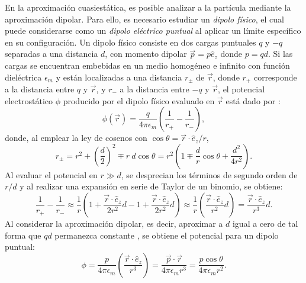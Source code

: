 En la aproximación cuasiestática, es posible analizar a la partícula mediante la aproximación dipolar. Para ello, es necesario estudiar un \textit{dipolo físico}, el cual puede considerarse como un \textit{dipolo eléctrico puntual} al aplicar un límite específico en su configuración. Un dipolo físico consiste en dos cargas puntuales $q$ y $-q$ separadas a una distancia $d$, con momento dipolar $\Vec{p}=p\hat{e}_z$ donde $p=qd$. Si las cargas se encuentran embebidas en un medio homogéneo e infinito con función dieléctrica $\epsilon_m$ y están localizadas a una distancia $r_{\pm}$ de $\Vec{r}$, donde $r_{+}$ corresponde a la distancia entre $q$ y $\Vec{r}$, y $r_{-}$ a la distancia entre $-q$ y $\Vec{r}$, el potencial  electrostático $\phi$ producido por el dipolo físico evaluado en $\Vec{r}$ está dado por \cite{Bohren,Griffiths}:
\begin{equation}
    \phi(\Vec{r})=\frac{q}{4\pi\epsilon_m}\left(\frac{1}{r_+}-\frac{1}{r_{-}}\right),    
\end{equation}
donde, al emplear la ley de cosenos con $\cos\theta=\Vec{r}\cdot\hat{e}_z/r$,
\begin{equation*}
	r_{\pm}=r^2+\left(\frac{d}{2}\right)^2\mp r\:d\cos\theta=r^2\left(1\mp\frac{d}{r}\cos\theta+\frac{d^2}{4r^2}\right).
\end{equation*}
Al evaluar el potencial en $r\gg d$, se desprecian los términos de segundo orden de $r/d$ y al realizar una expansión en serie de Taylor de un binomio, se obtiene:
\begin{equation}
    \frac{1}{r_+}-\frac{1}{r_{-}}\approx\frac{1}{r}\left(1+ \frac{\Vec{r}\cdot\hat{e}_z}{2r^2}d-1+ \frac{\Vec{r}\cdot\hat{e}_z}{2r^2}d\right)\approx\frac{1}{r}\left( \frac{\Vec{r}\cdot\hat{e}_z}{r^2}d\right)=\frac{\Vec{r}\cdot\hat{e}_z}{r^3}d.    
\end{equation}
Al considerar la aproximación dipolar, es decir, aproximar a $d$ igual a cero de tal forma que $qd$ permanezca constante \cite{Bohren}, se obtiene el potencial para un dipolo puntual:
\begin{equation}
\phi=\frac{p}{4\pi\epsilon_m}\left(\frac{\Vec{r}\cdot\hat{e}_z}{r^3}\right)=\frac{\Vec{p}\cdot\Vec{r}}{4\pi\epsilon_m r^3}=\frac{p\cos\theta}{4\pi\epsilon_m r^2}.
\label{pot_dipolo}
\end{equation}

